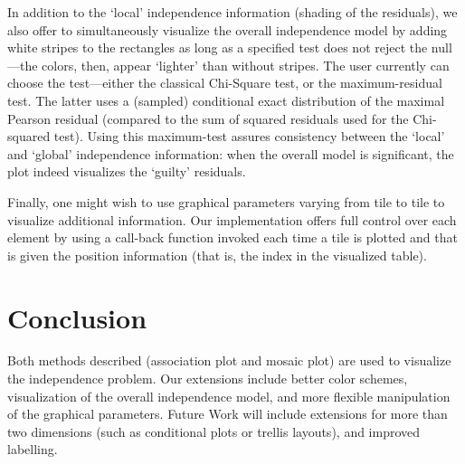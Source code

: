 \documentclass[10pt]{article}
\begin{document}
In addition to the `local' independence information (shading of the
residuals), we also offer to simultaneously visualize the overall independence
model by adding white stripes to the rectangles as long as a specified test does not
reject the null---the colors, then, appear `lighter' than without stripes.
The user currently can choose the test---either the classical
Chi-Square test, or the maximum-residual test. The latter uses a
(sampled) conditional exact distribution of the maximal Pearson
residual (compared to the sum of squared residuals used for the
Chi-squared test). Using this maximum-test assures consistency between the `local' and
`global' independence information: when the overall model is
significant, the plot indeed visualizes the `guilty' residuals.

Finally, one might wish to use graphical parameters varying from tile
to tile to visualize additional information.
Our implementation offers full control over 
each element by using a call-back function
invoked each time a tile is plotted and that is given the position
information (that is, the index in the visualized table).

\section{Conclusion}
Both methods described (association plot and mosaic plot) are used to
visualize the independence problem. Our extensions include better
color schemes, visualization of the overall independence model, and
more flexible manipulation of the graphical parameters.
Future Work will include extensions for more than two dimensions
(such as conditional plots or trellis layouts), and improved
labelling.



\end{document}

